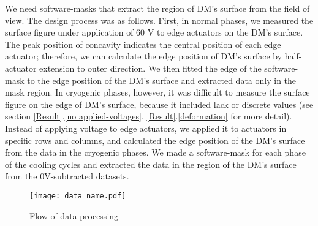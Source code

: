 \documentclass[a4paper]{article}
\begin{document}
We need software-masks that extract the region of DM's surface from the field of view. The design process was as follows. First, in normal phases, we measured the surface figure under application of 60 V to edge actuators on the DM's surface. The peak position of concavity indicates the central position of each edge actuator; therefore, we can calculate the edge position of DM's surface by half-actuator extension to outer direction. We then fitted the edge of the software-mask to the edge position of the DM's surface and extracted data only in the mask region. In cryogenic phases, however, it was difficult to measure the surface figure on the edge of DM's surface, because it included lack or discrete values (see section \ref{Result}.\ref{no applied-voltages}, \ref{Result}.\ref{deformation} for more detail). Instead of applying voltage to edge actuators, we applied it to actuators in specific rows and columns, and calculated the edge position of the DM's surface from the data in the cryogenic phases. We made a software-mask for each phase of the cooling cycles and extracted the data in the region of the DM's surface from the 0V-subtracted datasets.

\begin{figure}[htbp]
\centering
\texttt{[image: data\_name.pdf]}
\caption{Flow of data processing}
\label{data_name}
\end{figure}
\end{document}
